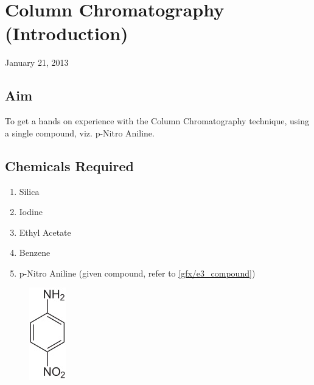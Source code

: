\chapter{Column Chromatography (Introduction)}
\begin{flushright}
January 21, 2013
\end{flushright}
\section{Aim}
To get a hands on experience with the Column Chromatography technique, using a single compound, viz. p-Nitro Aniline.

\section {Chemicals Required}
	\begin{enumerate}
		\item Silica
		\item Iodine
		\item Ethyl Acetate
		\item Benzene
		\item p-Nitro Aniline (given compound, refer to \autoref{gfx/e3_compound})
	\end{enumerate}

	\begin{figure}[bth]
		\begin{center}
			\includegraphics[width=0.1\linewidth]{gfx/e3_compound}
		\end{center}
	\caption[p-Nitroanline]{\label{e3_compound}}
	\end{figure}


